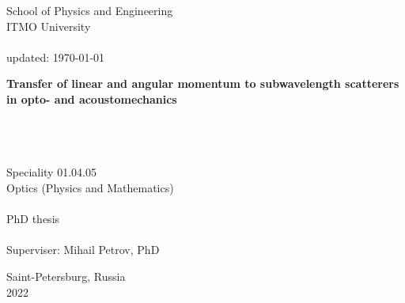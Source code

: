 \thispagestyle{empty}


\vspace{0pt plus2fill} %
\begin{center}
	School of Physics and Engineering \\
	ITMO University \\ \ \\
	{\tiny updated: \today} 
\end{center}

\vspace*{230pt}
\begin{center}
\textbf {\large %
Transfer of linear and angular momentum to subwavelength scatterers in opto- and acoustomechanics
} \\ \ \\ \
{\large 
	}
 \\ \ 

Speciality 01.04.05\\
Optics (Physics and Mathematics) \\ \ \\
PhD thesis \\ \ \\ 
Superviser: Mihail Petrov, PhD
\end{center}

\vspace{0pt plus2fill} %

\begin{center}
	Saint-Petersburg, Russia\\
	2022
\end{center}


